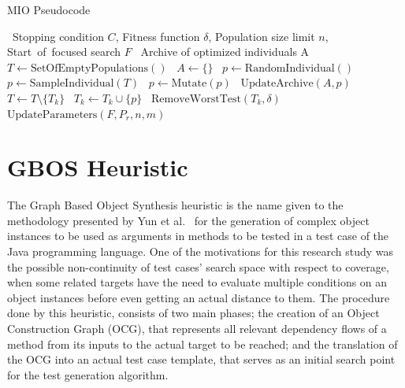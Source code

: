 \documentclass[%
  chapterprefix=false,%
  open=right,%
  twoside=true,%
  paper=a4,%
  logofile={Figures/logo.png},%
  thesistype=master,%
  UKenglish,%
]{se2thesis}
\begin{document}
\algrenewcommand{}
\algrenewcommand{}


\begin{algorithm}[htb]
  \centering
  \caption{MIO Pseudocode}\label{alg:MIOpseudo}
  \begin{algorithmic}[1]
    \Require~Stopping condition \(C\), Fitness function \(\delta\), Population size limit \(n\), Start~of~focused search \(F\)
    \Ensure~Archive of optimized individuals A
    \State~\(T \gets \text{SetOfEmptyPopulations}()\) 
    \State~\(A \gets \{\}\)
        \State~\(p \gets \text{RandomIndividual}()\)
      \Else\@
        \State~\(p \gets \text{SampleIndividual}(T)\)
        \State~\(p \gets \text{Mutate}(p)\)
      \EndIf\@
          \State~\(\text{UpdateArchive}(A, p)\)
          \State~\(T \gets T \setminus \{T_k\}\)
        \Else\@
          \State~\(T_k \gets T_k \cup \{p\}\)
          \State~\(\text{RemoveWorstTest}(T_k, \delta)\)
          \EndIf\@
        \EndIf\@
      \EndFor\@
      \State~\(\text{UpdateParameters}(F, P_r, n, m)\)
    \EndWhile\@
  \end{algorithmic}
  \end{algorithm}


\section{GBOS Heuristic}

The Graph Based Object Synthesis heuristic is the name given to the methodology presented by Yun et al.~\cite{DBLP:conf/sigsoft/0001O00D21} for the generation of complex object instances to be used as arguments in methods to be tested in a test case of the Java programming language.
One of the motivations for this research study was the possible non-continuity of test cases' search space with respect to coverage, when some related targets have the need to evaluate multiple conditions on an object instances before even getting an actual distance to them.
The procedure done by this heuristic, consists of two main phases; the creation of an Object Construction Graph (OCG), that represents all relevant dependency flows of a method from its inputs to the actual target to be reached; and the translation of the OCG into an actual test case template, that serves as an initial search point for the test generation algorithm.
\end{document}
